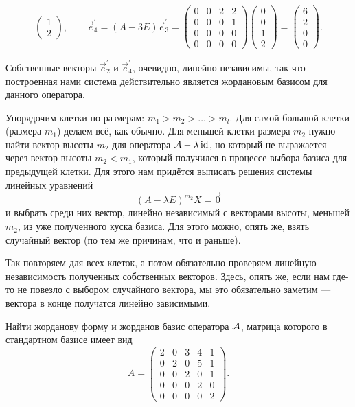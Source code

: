 \begin{solution}
\[\begin{pmatrix}
			1\\
			2
		\end{pmatrix},\qquad
		\vec{e}^\prime_4 = (A - 3E)\vec{e}^\prime_3 =
		\begin{pmatrix}
			0 & 0 & 2 & 2\\
			0 & 0 & 0 & 1\\
			0 & 0 & 0 & 0\\
			0 & 0 & 0 & 0
		\end{pmatrix}
		\begin{pmatrix}
			0\\
			0\\
			1\\
			2
		\end{pmatrix} =
		\begin{pmatrix}
			6\\
			2\\
			0\\
			0
		\end{pmatrix}.
	\]

	Собственные векторы $\vec{e}^\prime_2$ и $\vec{e}^\prime_4$, очевидно, линейно независимы, так что построенная нами система действительно является жордановым базисом для данного оператора.
\end{solution}

\medskip
{}
\smallskip

Упорядочим клетки по размерам: $m_1 > m_2 > \ldots > m_l$. Для самой большой клетки (размера $m_1$) делаем всё, как обычно. Для меньшей клетки размера $m_2$ нужно найти вектор высоты $m_2$ для оператора $\mathcal{A} - \lambda\operatorname{id}$, но который не выражается через вектор высоты $m_2 < m_1$, который получился в процессе выбора базиса для предыдущей клетки. Для этого нам придётся выписать решения системы линейных уравнений
\[
	(A - \lambda E)^{m_2}X = \vec{0}
\]
и выбрать среди них вектор, линейно независимый с векторами высоты, меньшей $m_2$, из уже полученного куска базиса. Для этого можно, опять же, взять случайный вектор (по тем же причинам, что и раньше).

Так повторяем для всех клеток, а потом обязательно проверяем линейную независимость полученных собственных векторов. Здесь, опять же, если нам где-то не повезло с выбором случайного вектора, мы это обязательно заметим --- вектора в конце получатся линейно зависимыми.

\begin{problem}
	Найти жорданову форму и жорданов базис оператора $\mathcal{A}$, матрица которого в стандартном базисе имеет вид
	\[
		A =
		\begin{pmatrix}
			2 & 0 & 3 & 4 & 1\\
			0 & 2 & 0 & 5 & 1\\
			0 & 0 & 2 & 0 & 1\\
			0 & 0 & 0 & 2 & 0\\
			0 & 0 & 0 & 0 & 2
		\end{pmatrix}.
	\]
\end{problem}


